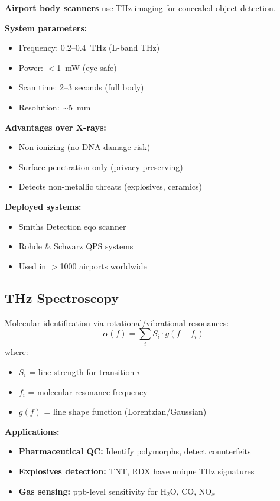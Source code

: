 \textbf{Airport body scanners} use THz imaging for concealed object detection.

\textbf{System parameters:}
\begin{itemize}
\item Frequency: 0.2--0.4~THz (L-band THz)
\item Power: $<$1~mW (eye-safe)
\item Scan time: 2--3 seconds (full body)
\item Resolution: $\sim$5~mm
\end{itemize}

\textbf{Advantages over X-rays:}
\begin{itemize}
\item Non-ionizing (no DNA damage risk)
\item Surface penetration only (privacy-preserving)
\item Detects non-metallic threats (explosives, ceramics)
\end{itemize}

\textbf{Deployed systems:}
\begin{itemize}
\item Smiths Detection eqo scanner
\item Rohde \& Schwarz QPS systems
\item Used in $>$1000 airports worldwide
\end{itemize}

\subsection{THz Spectroscopy}

Molecular identification via rotational/vibrational resonances:
\begin{equation}
\alpha(f) = \sum_i S_i \cdot g(f - f_i)
\end{equation}
where:
\begin{itemize}
\item $S_i$ = line strength for transition $i$
\item $f_i$ = molecular resonance frequency
\item $g(f)$ = line shape function (Lorentzian/Gaussian)
\end{itemize}

\textbf{Applications:}
\begin{itemize}
\item \textbf{Pharmaceutical QC:} Identify polymorphs, detect counterfeits
\item \textbf{Explosives detection:} TNT, RDX have unique THz signatures
\item \textbf{Gas sensing:} ppb-level sensitivity for H$_2$O, CO, NO$_x$
\end{itemize}

